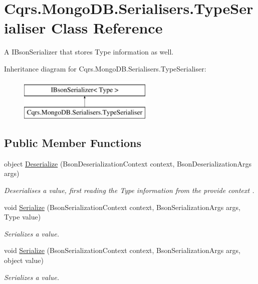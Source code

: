 \hypertarget{classCqrs_1_1MongoDB_1_1Serialisers_1_1TypeSerialiser}{}\section{Cqrs.\+Mongo\+D\+B.\+Serialisers.\+Type\+Serialiser Class Reference}
\label{classCqrs_1_1MongoDB_1_1Serialisers_1_1TypeSerialiser}


A I\+Bson\+Serializer that stores Type information as well.  


Inheritance diagram for Cqrs.\+Mongo\+D\+B.\+Serialisers.\+Type\+Serialiser\+:\begin{figure}[H]
\begin{center}
\leavevmode
\includegraphics[height=2.000000cm]{classCqrs_1_1MongoDB_1_1Serialisers_1_1TypeSerialiser}
\end{center}
\end{figure}
\subsection*{Public Member Functions}
\begin{DoxyCompactItemize}
\item 
object \hyperlink{classCqrs_1_1MongoDB_1_1Serialisers_1_1TypeSerialiser_a5e8aa7ae1372033da215d02b79947b20_a5e8aa7ae1372033da215d02b79947b20}{Deserialize} (Bson\+Deserialization\+Context context, Bson\+Deserialization\+Args args)
\begin{DoxyCompactList}\small\item\em Deserialises a value, first reading the Type information from the provide {\itshape context} . \end{DoxyCompactList}\item 
void \hyperlink{classCqrs_1_1MongoDB_1_1Serialisers_1_1TypeSerialiser_a4aec60f5df74f482b576f4e0dad0d5f6_a4aec60f5df74f482b576f4e0dad0d5f6}{Serialize} (Bson\+Serialization\+Context context, Bson\+Serialization\+Args args, Type value)
\begin{DoxyCompactList}\small\item\em Serializes a value. \end{DoxyCompactList}\item 
void \hyperlink{classCqrs_1_1MongoDB_1_1Serialisers_1_1TypeSerialiser_a2362ae784859054bf5b9281dafeb37cd_a2362ae784859054bf5b9281dafeb37cd}{Serialize} (Bson\+Serialization\+Context context, Bson\+Serialization\+Args args, object value)
\begin{DoxyCompactList}\small\item\em Serializes a value. \end{DoxyCompactList}\end{DoxyCompactItemize}
